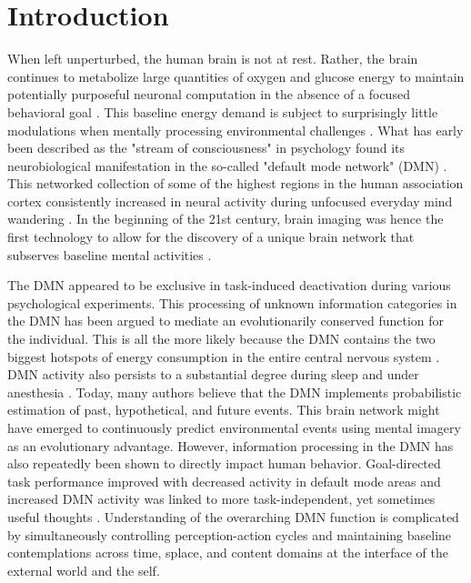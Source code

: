 \documentclass[10pt,letterpaper]{article}
\begin{document}
\section{Introduction}
%
When left unperturbed, the human brain is not at rest.
Rather, the brain continues to metabolize large quantities of
oxygen and glucose energy to maintain
potentially purposeful neuronal computation
in the absence of a focused behavioral goal
\citep{kenet2003spontaneously, fiser2004small}.
This baseline energy demand is subject to surprisingly little modulations
when mentally processing environmental challenges
\citep{raichle2001pnas}.
What has early been described as the "stream of consciousness"
in psychology \citep{james1890principles}
found its neurobiological manifestation
in the so-called "default mode network" (DMN)
\citep{shul1997}. This networked collection of some of the highest regions in
the human association cortex \citep{mesulam1998sensation, margulies2016situating}
consistently
increased in neural activity during
unfocused everyday mind wandering \citep{raichle2001pnas}.
In the beginning of the 21st century, brain imaging was hence the first technology
to allow for the discovery of a unique brain network that subserves
baseline mental activities
\citep{bzdok2015resting}.



The DMN appeared to be exclusive in task-induced
deactivation during various psychological experiments.
This processing of unknown information categories in the DMN has
been argued to mediate an evolutionarily conserved function for the individual.
This is all the more likely because the DMN contains the two
biggest hotspots of energy consumption in the entire central nervous system
\citep{raichle2001pnas}.
DMN activity also persists to a substantial degree during
sleep and under anesthesia \citep{randy2008}.
Today, many authors believe that the DMN implements
probabilistic estimation of past, hypothetical, and future events. This
brain network
might have emerged to continuously predict environmental events using
mental imagery as an evolutionary advantage.
%
However, information processing in the DMN has also repeatedly
been shown to directly impact human behavior. Goal-directed task performance
improved with decreased activity in default mode areas \citep{weiss2006}
and increased DMN activity was linked to more task-independent,
yet sometimes useful thoughts
\citep{mason2007, seli2016mind}.
%
Understanding of the overarching DMN function is complicated by
simultaneously controlling perception-action cycles and
maintaining baseline contemplations
across time, splace, and content domains
at the interface of the external world and the self.
\end{document}
